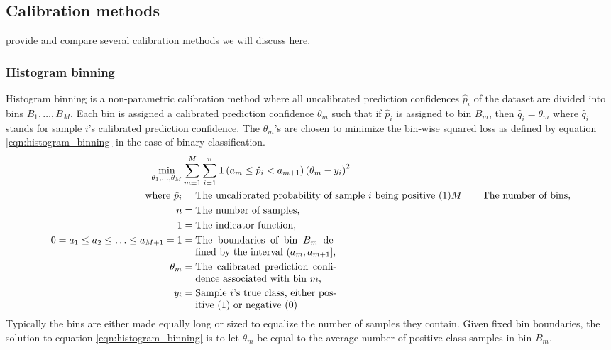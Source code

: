 \subsection{Calibration methods}
\cite{guo2017calibration} provide and compare several calibration methods we will discuss here.

\subsubsection{Histogram binning}
Histogram binning is a non-parametric calibration method where all uncalibrated prediction confidences $\hat{p}_{i}$ of the dataset are divided into bins $B_{1}, \ldots, B_{M}$. Each bin is assigned a calibrated prediction confidence $\theta_{m}$ such that if $\hat{p}_{i}$ is assigned to bin $B_{m}$, then $\hat{q}_{i}=\theta_{m}$ where $\hat{q}_{i}$ stands for sample $i$'s calibrated prediction confidence. The $\theta_{m}$'s are chosen to minimize the bin-wise squared loss as defined by equation \ref{eqn:histogram_binning} in the case of binary classification.
\begin{align}
  \label{eqn:histogram_binning}
  \min_{\theta_{1}, \ldots, \theta_{M}} &\sum_{m=1}^{M} \sum_{i=1}^{n} \mathbf{1}\left(a_{m} \leq \hat{p}_{i}<a_{m+1}\right)\left(\theta_{m}-y_{i}\right)^{2} \\ \nonumber
  \text{where}~\hat{p}_{i} &= \text{The uncalibrated probability of sample $i$ being positive (1)}
  M &= \text{The number of bins}, \\ \nonumber
  n &= \text{The number of samples}, \\ \nonumber
  1 &= \text{The indicator function}, \\ \nonumber
  0=a_{1} \leq a_{2} \leq \ldots \leq a_{M+1}=1 &= \parbox[t]{5cm}{The boundaries of bin $B_{m}$ defined by the interval $\left(a_{m}, a_{m+1}\right]$,} \\ \nonumber
  \theta_{m} &= \parbox[t]{5cm}{The calibrated prediction confidence associated with bin $m$,} \\ \nonumber
  y_{i} &= \parbox[t]{5cm}{Sample $i$'s true class, either positive (1) or negative (0)}
\end{align}
Typically the bins are either made equally long or sized to equalize the number of samples they contain.
Given fixed bin boundaries, the solution to equation \ref{eqn:histogram_binning} is to let $\theta_{m}$ be equal to the average number of positive-class samples in bin $B_{m}$.

